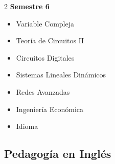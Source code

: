 \documentclass[12pt,a4paper]{article}
\begin{document}
\begin{multicols}{2}
		\textbf{Semestre 6}
		\begin{itemize}
			\item Variable Compleja
			\item Teoría de Circuitos II
			\item Circuitos Digitales
			\item Sistemas Lineales Dinámicos
			\item Redes Avanzadas
			\item Ingeniería Económica
			\item Idioma
		\end{itemize}
	\end{multicols}
	
	\newpage
	
	\subsection{Pedagogía en Inglés}
	
\end{document}
